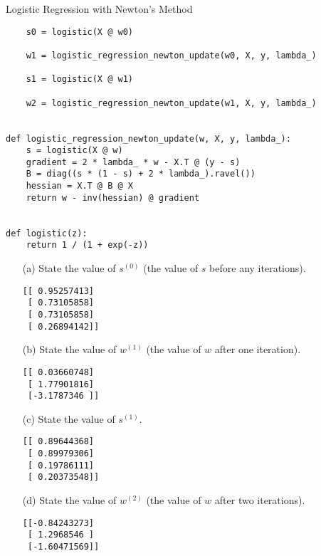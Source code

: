 \documentclass[section]{problemset}
\begin{document}
\begin{problem}{Logistic Regression with Newton's Method}
\begin{enumerate}
\begin{mdframed}
\begin{verbatim}
    s0 = logistic(X @ w0)

    w1 = logistic_regression_newton_update(w0, X, y, lambda_)

    s1 = logistic(X @ w1)

    w2 = logistic_regression_newton_update(w1, X, y, lambda_)


def logistic_regression_newton_update(w, X, y, lambda_):
    s = logistic(X @ w)
    gradient = 2 * lambda_ * w - X.T @ (y - s)
    B = diag((s * (1 - s) + 2 * lambda_).ravel())
    hessian = X.T @ B @ X
    return w - inv(hessian) @ gradient


def logistic(z):
    return 1 / (1 + exp(-z))
  \end{verbatim}
\end{mdframed}

\begin{itemize}
\item[(a)]
State the value of $s^{(0)}$ (the value of $s$ before any iterations).

\begin{mdframed}
\begin{verbatim}
[[ 0.95257413]
 [ 0.73105858]
 [ 0.73105858]
 [ 0.26894142]]
\end{verbatim}
\end{mdframed}


\item[(b)]
State the value of $w^{(1)}$ (the value of $w$ after one iteration).
\begin{mdframed}
\begin{verbatim}
[[ 0.03660748]
 [ 1.77901816]
 [-3.1787346 ]]
\end{verbatim}
\end{mdframed}


\item[(c)]
State the value of $s^{(1)}$.
\begin{mdframed}
\begin{verbatim}
[[ 0.89644368]
 [ 0.89979306]
 [ 0.19786111]
 [ 0.20373548]]
\end{verbatim}
\end{mdframed}


\item[(d)]
State the value of $w^{(2)}$ (the value of $w$ after two iterations).
\begin{mdframed}
\begin{verbatim}
[[-0.84243273]
 [ 1.2968546 ]
 [-1.60471569]]
\end{verbatim}
\end{mdframed}

\end{itemize}
\end{enumerate}
\end{problem}
\end{document}
